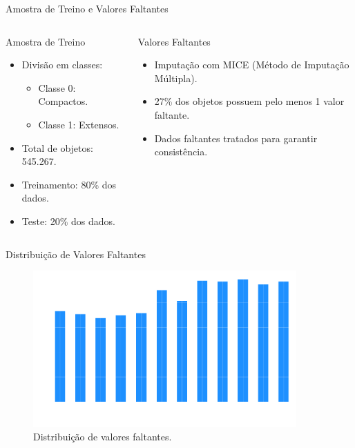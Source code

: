\begin{frame}[c]{Amostra de Treino e Valores Faltantes}
    \begin{columns}[c]
        \begin{column}{0.48\textwidth}
            \begin{splusbox}{Amostra de Treino}
                \begin{itemize}
                    \item Divisão em classes:
                    \begin{itemize}
                        \item Classe 0: Compactos.
                        \item Classe 1: Extensos.
                    \end{itemize}
                    \item Total de objetos: 545.267.
                    \item Treinamento: 80\% dos dados.
                    \item Teste: 20\% dos dados.
                \end{itemize}
            \end{splusbox}
        \end{column}
        \begin{column}{0.48\textwidth}
            \begin{splusbox}{Valores Faltantes}
                \begin{itemize}
                    \item Imputação com MICE (Método de Imputação Múltipla).
                    \item 27\% dos objetos possuem pelo menos 1 valor faltante.
                    \item Dados faltantes tratados para garantir consistência.
                \end{itemize}
            \end{splusbox}
        \end{column}
    \end{columns}
\end{frame}

\begin{frame}[c]{Distribuição de Valores Faltantes}
    \vspace{0.5cm}
    \begin{figure}
        \centering
        \includegraphics[width=0.8\linewidth, height=6cm, keepaspectratio]{images/missing_values_hist.png}
        \caption{Distribuição de valores faltantes.}
    \end{figure}
\end{frame}

